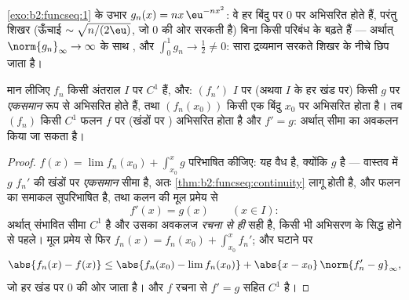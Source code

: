 \begin{omfigure}

{\small \cref{exo:b2:funcseq:1} के उभार $g_n(x) = nx\,\eu^{-nx^2}$: वे हर बिंदु पर $0$ पर अभिसरित होते हैं, परंतु
शिखर (ऊँचाई $\sim\sqrt{n/(2\eu)}$, जो $0$ की ओर सरकती है) बिना किसी परिबंध के बढ़ते हैं
--- अर्थात् $\norm{g_n}_\infty \to \infty$ के साथ , और $\int_0^1 g_n \to \frac12
\neq 0$: सारा द्रव्यमान सरकते
शिखर के नीचे छिप जाता है।}
\end{omfigure}

\begin{theorem}[अवकलन]\label{thm:b2:funcseq:differentiation}
मान लीजिए $f_n$ किसी अंतराल $I$ पर $C^1$ हैं, और: $(f_n')$ $I$ पर (अथवा $I$ के हर
खंड पर) किसी $g$ पर \emph{एकसमान} रूप से अभिसरित होते हैं, तथा $(f_n(x_0))$ किसी
एक बिंदु $x_0$ पर अभिसरित होता है। तब $(f_n)$ किसी $C^1$ फलन $f$ पर (खंडों पर
) अभिसरित होता है और $f'
= g$: अर्थात् सीमा का अवकलन किया जा
सकता है।
\end{theorem}

\begin{proof}
$f(x) = \lim f_n(x_0) + \int_{x_0}^x g$ परिभाषित कीजिए: यह वैध है, क्योंकि $g$  है --- वास्तव में $g$
 $f_n'$ की खंडों पर \emph{एकसमान} सीमा है, अतः \cref{thm:b2:funcseq:continuity} लागू होती है, और
 फलन का समाकल सुपरिभाषित है, तथा कलन की मूल प्रमेय से
\[
f'(x) = g(x) \qquad (x \in I) :
\]
अर्थात् संभावित सीमा $C^1$ है और उसका अवकलज \emph{रचना से ही} सही है, किसी
भी अभिसरण के सिद्ध होने से पहले। मूल प्रमेय से फिर $f_n(x) = f_n(x_0) + \int_{x_0}^x
f_n'$; और घटाने पर
\[
\abs{f_n(x) - f(x)} \leq \abs{f_n(x_0) - \lim f_n(x_0)}
+ \abs{x - x_0}\,\norm{f_n' - g}_{\infty} ,
\]
जो हर खंड पर  $0$ की ओर जाता है। और $f$ रचना से $f' = g$ सहित
$C^1$ है।
\end{proof}

